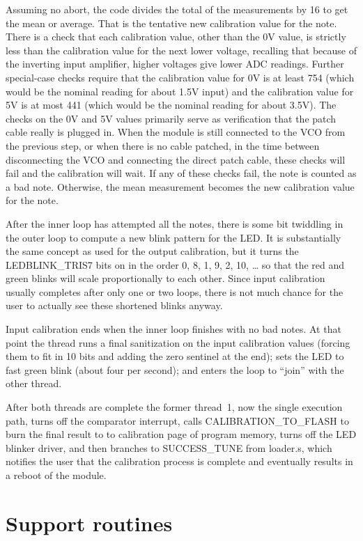 Assuming no abort, the code divides the total of the measurements by 16 to
get the mean or average.  That is the tentative new calibration value for
the note.  There is a check that each calibration value, other than the 0V
value, is strictly less than the calibration value for the next lower
voltage, recalling that because of the inverting input amplifier, higher
voltages give lower ADC readings.  Further special-case checks require that
the calibration value for 0V is at least 754 (which would be the nominal
reading for about 1.5V input) and the calibration value for 5V is at most
441 (which would be the nominal reading for about 3.5V).  The checks on the
0V and 5V values primarily serve as verification that the patch cable really
is plugged in.  When the module is still connected to the VCO from the
previous step, or when there is no cable patched, in the time between
disconnecting the VCO and connecting the direct patch cable, these checks
will fail and the calibration will wait.  If any of these checks fail, the
note is counted as a bad note.  Otherwise, the mean measurement becomes the
new calibration value for the note.

After the inner loop has attempted all the notes, there is some bit
twiddling in the outer loop to compute a new blink pattern for the LED.  It
is substantially the same concept as used for the output calibration, but it
turns the LEDBLINK\_TRIS7 bits on in the order 0, 8, 1, 9, 2, 10, {\ldots}
so that the red and green blinks will scale proportionally to each other. 
Since input calibration usually completes after only one or two loops, there
is not much chance for the user to actually see these shortened blinks
anyway.

Input calibration ends when the inner loop finishes with no bad notes.  At
that point the thread runs a final sanitization on the input calibration
values (forcing them to fit in 10 bits and adding the zero sentinel at the
end); sets the LED to fast green blink (about four per second); and enters
the loop to ``join'' with the other thread.

After both threads are complete the former thread~1, now the single
execution path, turns off the comparator interrupt, calls
CALIBRATION\_TO\_FLASH to burn the final result to to calibration page of
program memory, turns off the LED blinker driver, and then branches to
SUCCESS\_TUNE from loader.s, which notifies the user that the calibration
process is complete and eventually results in a reboot of the module.

\section{Support routines}

